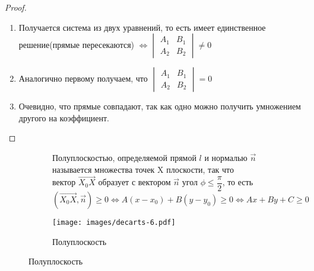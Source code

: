 \begin{proof}
	\begin{enumerate}
		\item Получается система из двух уравнений, то есть имеет единственное решение(прямые пересекаются) $\Longleftrightarrow \begin{vmatrix}
			A_1 & B_1 \\ A_2 & B_2
		\end{vmatrix} \ne 0$
		\item Аналогично первому получаем, что \(\begin{vmatrix}
			A_1 & B_1 \\ A_2 & B_2
		\end{vmatrix} = 0\)
		\item Очевидно, что прямые совпадают, так как одно можно получить умножением другого на коэффициент.
	\end{enumerate}
\end{proof}

\begin{figure}[h]
	\begin{subfigure}[t!]{0.6\linewidth}
		\begin{definition}
			Полуплоскостью, определяемой прямой \(l\) и нормалью \(\vec n\) называется множества точек X плоскости, так что вектор \(\vec{X_0X}\) образует с вектором $\vec{n}$ угол \(\phi\le \dfrac{\pi}{2}\), то есть \((\vec{X_0X}, \vec n)\ge0\Longleftrightarrow A(x-x_0)+B(y-y_0)\ge 0 \Longleftrightarrow Ax+By+C\ge 0\) 
		\end{definition}
	\end{subfigure}
	\begin{subfigure}[b!]{0.4\linewidth}
		\centering
		\texttt{[image: images/decarts-6.pdf]}
		\caption*{Полуплоскость}
		\label{Decart6}
	\end{subfigure}
\end{figure}
